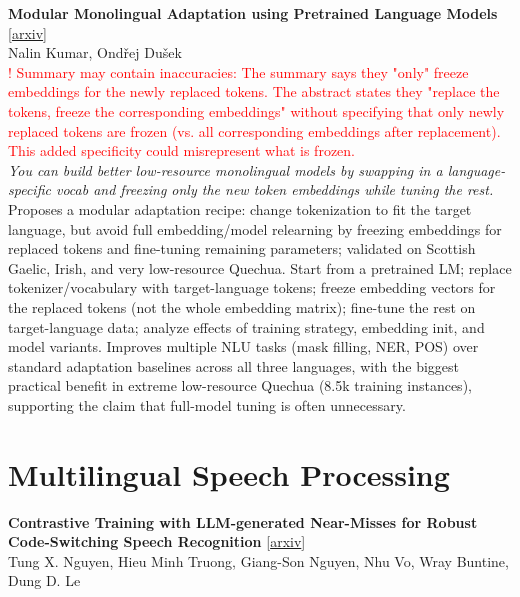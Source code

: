 \documentclass[12pt,letterpaper]{article}
\begin{document}
\medskip

{\small\textbf{Modular Monolingual Adaptation using Pretrained Language Models}} {\scriptsize[\href{https://arxiv.org/abs/2606.06738}{arxiv}]}\\
{\scriptsize Nalin Kumar, Ond\v{r}ej Du\v{s}ek}\\

{\scriptsize\textcolor{red}{! Summary may contain inaccuracies: The summary says they "only" freeze embeddings for the newly replaced tokens. The abstract states they "replace the tokens, freeze the corresponding embeddings" without specifying that only newly replaced tokens are frozen (vs. all corresponding embeddings after replacement). This added specificity could misrepresent what is frozen.}}\\[1pt]

{\small\textit{You can build better low-resource monolingual models by swapping in a language-specific vocab and freezing only the new token embeddings while tuning the rest.}}\\[1pt]
{\footnotesize Proposes a modular adaptation recipe: change tokenization to fit the target language, but avoid full embedding/model relearning by freezing embeddings for replaced tokens and fine-tuning remaining parameters; validated on Scottish Gaelic, Irish, and very low-resource Quechua. Start from a pretrained LM; replace tokenizer/vocabulary with target-language tokens; freeze embedding vectors for the replaced tokens (not the whole embedding matrix); fine-tune the rest on target-language data; analyze effects of training strategy, embedding init, and model variants. Improves multiple NLU tasks (mask filling, NER, POS) over standard adaptation baselines across all three languages, with the biggest practical benefit in extreme low-resource Quechua (8.5k training instances), supporting the claim that full-model tuning is often unnecessary.}

\medskip


\section*{Multilingual Speech Processing}

{\small\textbf{Contrastive Training with LLM-generated Near-Misses for Robust Code-Switching Speech Recognition}} {\scriptsize[\href{https://arxiv.org/abs/2606.06985}{arxiv}]}\\
{\scriptsize Tung X. Nguyen, Hieu Minh Truong, Giang-Son Nguyen, Nhu Vo, Wray Buntine, Dung D. Le}\\
\end{document}
